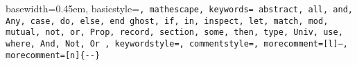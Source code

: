 { basewidth=0.45em,
  basicstyle=\scriptsize\tt,  %
  mathescape,
  keywords={
    abstract, all, and, Any,
    case,
    do,
    else, end
    ghost,
    if, in, inspect,
    let,
    match, mod, mutual,
    not,
    or,
    Prop,
    record,
    section, some,
    then, type,
    Univ, use,
    where,
    And,
    Not,
    Or
  },
  keywordstyle=\color{blue},
  commentstyle=\color{brown},
  morecomment=[l]{--},
  morecomment=[n]{\{-}{-\}}
}

 {\lstset{language=alba}} {}
